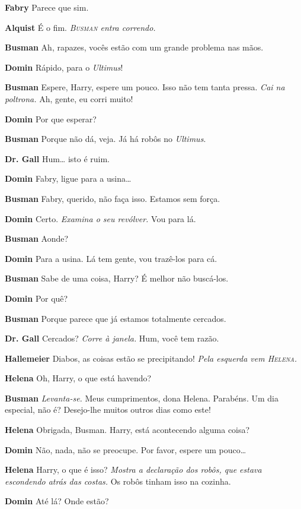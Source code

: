 \textbf{Fabry} Parece que sim.

\textbf{Alquist} É o fim.
\emph{\textsc{Busman} entra correndo.}

\textbf{Busman} Ah, rapazes, vocês estão com um grande problema nas mãos.

\textbf{Domin} Rápido, para o \textit{Ultimus}!

\textbf{Busman} Espere, Harry, espere um pouco. Isso não tem tanta pressa. \emph{Cai na
poltrona.} Ah, gente, eu corri muito!

\textbf{Domin} Por que esperar?

\textbf{Busman} Porque não dá, veja. Já há robôs no \textit{Ultimus}.

\textbf{Dr. Gall} Hum\ldots{} isto é ruim.

\textbf{Domin} Fabry, ligue para a usina\ldots{}

\textbf{Busman} Fabry, querido, não faça isso. Estamos sem força.

\textbf{Domin} Certo. \emph{Examina o seu revólver.} Vou para lá.

\textbf{Busman} Aonde?

\textbf{Domin} Para a usina. Lá tem gente, vou trazê-los para cá.

\textbf{Busman} Sabe de uma coisa, Harry? É melhor não \mbox{buscá-los}.

\textbf{Domin} Por quê?

\textbf{Busman} Porque parece que já estamos totalmente \mbox{cercados}.

\textbf{Dr. Gall} Cercados? \emph{Corre à janela.} Hum, você tem razão.

\textbf{Hallemeier} Diabos, as coisas estão se precipitando! \emph{Pela esquerda vem \textsc{Helena}.}

\textbf{Helena} Oh, Harry, o que está havendo?

\textbf{Busman} \emph{Levanta-se.} Meus cumprimentos, dona Helena. Parabéns. Um dia
especial, não é? Desejo-lhe muitos outros dias como este!

\textbf{Helena} Obrigada, Busman. Harry, está acontecendo alguma coisa?

\textbf{Domin} Não, nada, não se preocupe. Por favor, espere um pouco\ldots{}

\textbf{Helena} Harry, o que é isso? \emph{Mostra a declaração dos robôs, que estava
escondendo atrás das costas.} Os robôs tinham isso na cozinha.

\textbf{Domin} Até lá? Onde estão?

